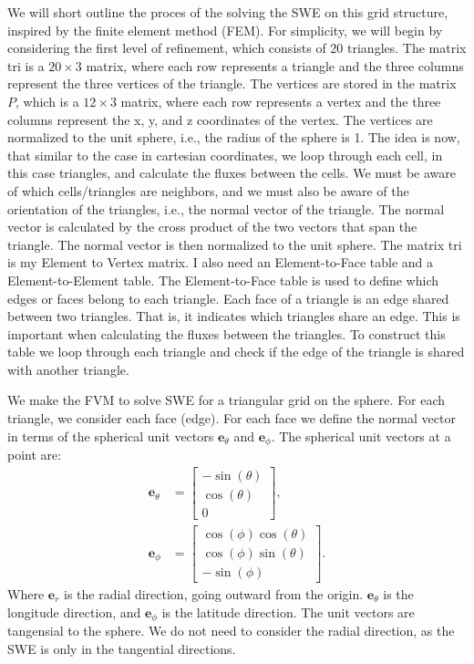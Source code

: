 

We will short outline the proces of the solving the SWE on this grid structure, inspired by the finite element method (FEM).
For simplicity, we will begin by considering the first level of refinement, which consists of 20 triangles.
The matrix tri is a $20 \times 3$ matrix, where each row represents a triangle and the three columns represent the three vertices of the triangle.
The vertices are stored in the matrix $P$, which is a $12 \times 3$ matrix, where each row represents a vertex and the three columns represent the x, y, and z coordinates of the vertex.
The vertices are normalized to the unit sphere, i.e., the radius of the sphere is 1.
The idea is now, that similar to the case in cartesian coordinates, we loop through each cell, in this case triangles, and calculate the fluxes between the cells.
We must be aware of which cells/triangles are neighbors, and we must also be aware of the orientation of the triangles, i.e., the normal vector of the triangle.
The normal vector is calculated by the cross product of the two vectors that span the triangle.
The normal vector is then normalized to the unit sphere.
The matrix tri is my Element to Vertex matrix. 
I also need an Element-to-Face table and a Element-to-Element table.
The Element-to-Face table is used to define which edges or faces belong to each triangle.
Each face of a triangle is an edge shared between two triangles.
That is, it indicates which triangles share an edge. This is important when calculating the fluxes between the triangles.
To construct this table we loop through each triangle and check if the edge of the triangle is shared with another triangle.


We make the FVM to solve SWE for a triangular grid on the sphere.
For each triangle, we consider each face (edge).
For each face we define the normal vector in terms of the spherical unit vectors $\mathbf{e}_\theta$ and $\mathbf{e}_\phi$.
The spherical unit vectors at a point are:
\begin{align*}
    \mathbf{e}_\theta &= \begin{bmatrix}
        - \sin(\theta) \\
        \cos(\theta) \\
        0
    \end{bmatrix}, \\
    \mathbf{e}_\phi &= \begin{bmatrix}
        \cos(\phi) \cos(\theta) \\
        \cos(\phi) \sin(\theta) \\
        -\sin(\phi)
    \end{bmatrix}.
\end{align*}
Where $\mathbf{e}_r$ is the radial direction, going outward from the origin.
$\mathbf{e}_\theta$ is the longitude direction, and $\mathbf{e}_\phi$ is the latitude direction.
The unit vectors are tangensial to the sphere.
We do not need to consider the radial direction, as the SWE is only in the tangential directions.

